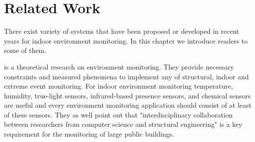 \documentclass[journal]{IEEEtran}
\begin{document}
%



\section{Related Work}
There exist variety of systems that have been proposed or developed in recent years for indoor environment monitoring. In this chapter we introduce readers to some of them.

\cite{Demirbas05wirelesssenso} is a theoretical research on environment monitoring. They provide necessary constraints and measured phenomena to implement any of structural, indoor and extreme event monitoring. For indoor environment monitoring temperature, humidity, true-light sensors, infrared-based presence sensors, and chemical sensors are useful and every environment monitoring application should consist of at least of these sensors. They as well point out that "interdisciplinary collaboration between researchers from computer science and structural engineering" is a key requirement for the monitoring of large public buildings. 
\end{document}
